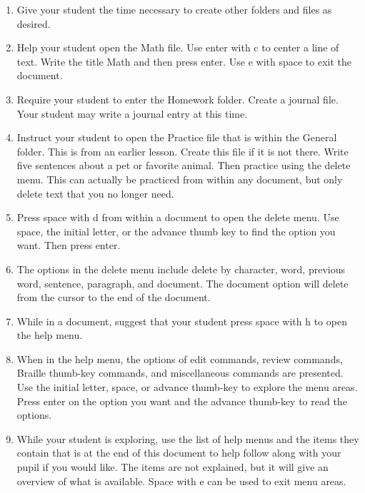 \documentclass[10pt,letterpaper,twoside]{report}
\begin{document}
{{{{\begin{enumerate}
	\item Give your student the time necessary to create other folders and files as desired.
	      
	\item Help your student open the Math file.  Use enter with c to center a line of text.  Write the title Math and then press enter. Use e with space to exit the document.
	      
	\item Require your student to enter the Homework folder.  Create a journal file.  Your student may write a journal entry at this time.
	      
	\item Instruct your student to open the Practice file that is within the General folder.  This is from an earlier lesson.  Create this file if it is not there.  Write five sentences about a pet or favorite animal.  Then practice using the delete menu.  This can actually be practiced from within any document, but only delete text that you no longer need.
	      
	\item Press space with d from within a document to open the delete menu. Use space, the initial letter, or the advance thumb key to find the option you want.  Then press enter.
	      
	\item The options in the delete menu include delete by character, word, previous word, sentence, paragraph, and document.  The document option will delete from the cursor to the end of the document.
	      
	\item While in a document, suggest that your student press space with h to open the help menu.
	      
	\item When in the help menu, the options of edit commands, review commands, Braille thumb-key commands, and miscellaneous commands are presented.  Use the initial letter, space, or advance thumb-key to explore the menu areas. Press enter on the option you want and the advance thumb-key to read the options.
	      
	\item While your student is exploring, use the list of help menus and the items they contain that is at the end of this document to help follow along with your pupil if you would like.  The items are not explained, but it will give an overview of what is available.  Space with e can be used to exit menu areas.
	      

\end{enumerate}}}}}
\end{document}
